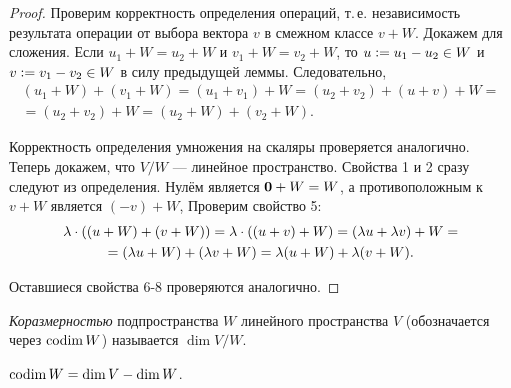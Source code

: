 \begin{proof}
    Проверим корректность определения операций, т.\,е. независимость результата операции от выбора вектора $v$ в смежном классе $v + W$. Докажем для сложения. Если $u_1 + W = u_2 + W$ и $v_1 + W = v_2 + W$, то $u \vcentcolon = u_1 - u_2 \in W$ и $v \vcentcolon = v_1 - v_2 \in W$ в силу предыдущей леммы. Следовательно,
    \begin{multline*}
        (u_1 + W) + (v_1 + W) = (u_1 + v_1) + W = (u_2 + v_2) + (u + v) + W =\\ = (u_2 + v_2) + W = (u_2 + W) + (v_2 + W).
    \end{multline*}

    Корректность определения умножения на скаляры проверяется аналогично. Теперь докажем, что $V / W$ --- линейное пространство. Свойства 1 и 2 сразу следуют из определения. Нулём является $\boldsymbol{0} + W = W$, а противоположным к $v + W$ является $(-v) + W$, Проверим свойство 5:
    \begin{multline*}
        \lambda \cdot \left((u + W) + (v + W)\right) = \lambda \cdot \left((u + v) + W\right) = (\lambda u + \lambda v) + W =\\ = (\lambda u + W) + (\lambda v + W) = \lambda(u + W) + \lambda(v + W).
    \end{multline*}

    Оставшиеся свойства 6-8 проверяются аналогично.
\end{proof}

\begin{definition}
    \textit{Коразмерностью} подпространства $W$ линейного пространства $V$ (обозначается через $\operatorname{codim} W$) называется $\dim V / W$.
\end{definition}

\begin{theorem}
    $\operatorname{codim} W = \dim V - \dim W$.
\end{theorem}


